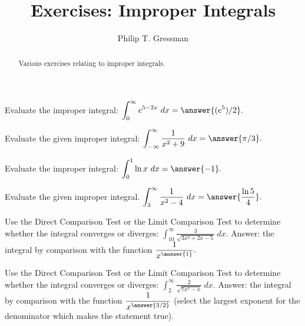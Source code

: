 \documentclass{ximera}
\title{Exercises: Improper Integrals}
\author{Philip T. Gressman}
\begin{document}
\begin{abstract}
Various exercises relating to improper integrals.
\end{abstract}
\maketitle

\begin{exercise}%
Evaluate the improper integral: \(\displaystyle \int_0^\infty e^{5-2x}\ dx = \answer{(e^5)/2}.\)
%
%
\end{exercise}

\begin{exercise}%
Evaluate the given improper integral: \(\displaystyle \int_{-\infty}^\infty \frac{1}{x^2+9}\ dx = \answer{\pi/3}.\)
%
%
\end{exercise}

\begin{exercise}
Evaluate the improper integral: \(\displaystyle \int_0^1 \ln x \ dx = \answer{-1}.\)
\end{exercise}

\begin{exercise}%
Evaluate the given improper integral. \(\displaystyle \int_{3}^\infty\frac{1}{x^2-4}\ dx = \answer{\frac{\ln 5}{4}}.\)
%
%
\end{exercise}

\begin{exercise}%
Use the Direct Comparison Test or the Limit Comparison Test to determine whether the integral converges or diverges:
 \(\displaystyle \int_{10}^\infty \frac{3}{\sqrt{3x^2+2x-5}} \ dx.\)
 Answer: the integral 
  by  comparison with the function $\displaystyle \frac{1}{x^{\answer{1}}}.$
%
%
\end{exercise}

\begin{exercise}
Use the Direct Comparison Test or the Limit Comparison Test to determine whether the integral converges or diverges:
 \(\displaystyle \int_{2}^\infty \frac{2}{\sqrt{7x^3-x}} \ dx.\)
 Answer: the integral 
  by  comparison with the function $\displaystyle \frac{1}{x^{\answer{3/2}}}$ (select the largest exponent for the denominator which makes the statement true).
\end{exercise}
\end{document}
